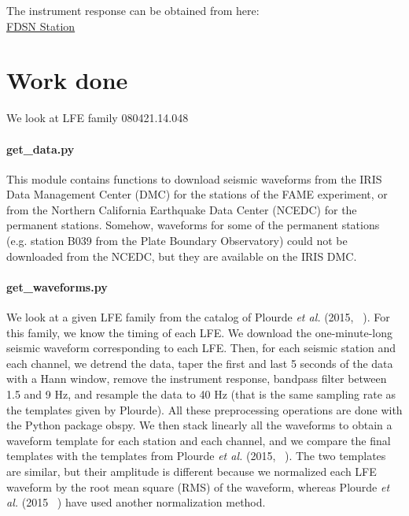 \documentclass[workdone.tex]{subfiles}
\begin{document}
The instrument response can be obtained from here: \\

\href{http://service.ncedc.org/fdsnws/station/1/#description-box}{FDSN Station}

\section{Work done}

We look at LFE family 080421.14.048

\paragraph{get\_data.py} This module contains functions to download seismic waveforms from the IRIS Data Management Center (DMC) for the stations of the FAME experiment, or from the Northern California Earthquake Data Center (NCEDC) for the permanent stations. Somehow, waveforms for some of the permanent stations (e.g. station B039 from the Plate Boundary Observatory) could not be downloaded from the NCEDC, but they are available on the IRIS DMC.

\paragraph{get\_waveforms.py} We look at a given LFE family from the catalog of Plourde \textit{et al.} (2015, ~\cite{PLO_2015}). For this family, we know the timing of each LFE. We download the one-minute-long seismic waveform corresponding to each LFE. Then, for each seismic station and each channel, we detrend the data, taper the first and last 5 seconds of the data with a Hann window, remove the instrument response, bandpass filter between 1.5 and 9 Hz, and resample the data to 40 Hz (that is the same sampling rate as the templates given by Plourde). All these preprocessing operations are done with the Python package obspy. We then stack linearly all the waveforms to obtain a waveform template for each station and each channel, and we compare the final templates with the templates from Plourde \textit{et al.} (2015, ~\cite{PLO_2015}). The two templates are similar, but their amplitude is different because we normalized each LFE waveform by the root mean square (RMS) of the waveform, whereas Plourde \textit{et al.} (2015 ~\cite{PLO_2015}) have used another normalization method.
\end{document}
